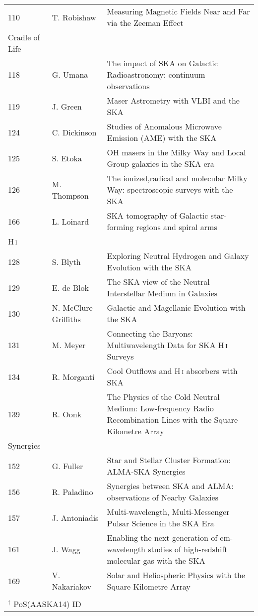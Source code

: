 \begin{table}
\begin{center}
\begin{tabular}{llp{}}
110 & T. Robishaw  & Measuring Magnetic Fields Near and Far via the Zeeman Effect\\
\noalign{\smallskip}
\hline
\noalign{\smallskip}
Cradle of Life &&\\
118 & G. Umana  & The impact of SKA on Galactic Radioastronomy: continuum observations\\
119 & J. Green  & Maser Astrometry with VLBI and the SKA\\
124 & C. Dickinson  & Studies of Anomalous Microwave Emission (AME) with the SKA\\
125 & S. Etoka  & OH masers in the Milky Way and Local Group galaxies in the SKA era\\
126 & M. Thompson  & The ionized,radical and molecular Milky Way: spectroscopic surveys with the SKA\\
166 & L. Loinard  & SKA tomography of Galactic star-forming regions and spiral arms\\
\noalign{\smallskip}
\hline
\noalign{\smallskip}
H\,\textsc{i} &&\\
128 & S. Blyth  & Exploring Neutral Hydrogen and Galaxy Evolution with the SKA\\
129 & E. de Blok  & The SKA view of the Neutral Interstellar Medium in Galaxies\\
130 & N. McClure-Griffiths  & Galactic and Magellanic Evolution with the SKA\\
131 & M. Meyer  & Connecting the Baryons: Multiwavelength Data for SKA H\,\textsc{i} Surveys\\
134 & R. Morganti  & Cool Outflows and H\,\textsc{i} absorbers with SKA\\
139 & R. Oonk  & The Physics of the Cold Neutral Medium: Low-frequency Radio Recombination Lines with the Square Kilometre Array\\
\noalign{\smallskip}
\hline
\noalign{\smallskip}
Synergies &&\\
152 & G. Fuller  & Star and Stellar Cluster Formation: ALMA-SKA Synergies\\
156 & R. Paladino  & Synergies between SKA and ALMA: observations of Nearby Galaxies\\
157 & J. Antoniadis  & Multi-wavelength, Multi-Messenger Pulsar Science in the SKA Era\\
161 & J. Wagg  & Enabling the next generation of cm-wavelength studies of high-redshift molecular gas with the SKA\\
169 & V. Nakariakov  & Solar and Heliospheric Physics with the Square Kilometre Array\\
\noalign{\smallskip}
\hline
\noalign{\smallskip}
\multicolumn{2}{l}{\small $^{*}$ArXiv未投稿含む} & \\
\multicolumn{2}{l}{\small $^\dag$ PoS(AASKA14) ID} & \\
\end{tabular}\label{c08.s2.t1}
\end{center}
\end{table}
